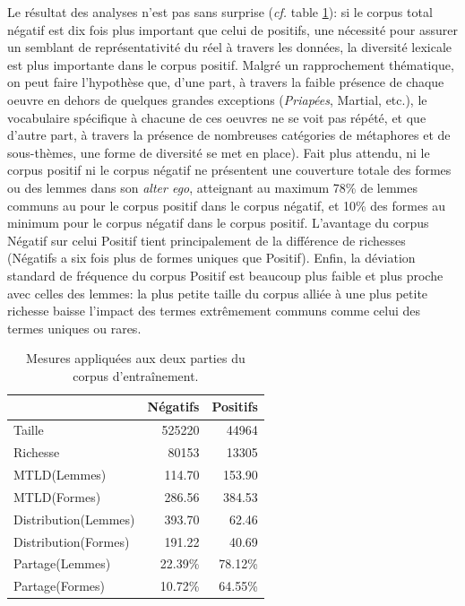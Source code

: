 Le résultat des analyses n'est pas sans surprise (\textit{cf.} table \ref{tab:chap4:mesures-corpora}): si le corpus total négatif est dix fois plus important que celui de positifs, une nécessité pour assurer un semblant de représentativité du réel à travers les données, la diversité lexicale est plus importante dans le corpus positif. Malgré un rapprochement thématique, on peut faire l'hypothèse que, d'une part, à travers la faible présence de chaque oeuvre en dehors de quelques grandes exceptions (\textit{Priapées}, Martial, etc.), le vocabulaire spécifique à chacune de ces oeuvres ne se voit pas répété, et que d'autre part, à travers la présence de nombreuses catégories de métaphores et de sous-thèmes, une forme de diversité se met en place). Fait plus attendu, ni le corpus positif ni le corpus négatif ne présentent une couverture totale des formes ou des lemmes dans son \textit{alter ego}, atteignant au maximum 78\% de lemmes communs au pour le corpus positif dans le corpus négatif, et 10\% des formes au minimum pour le corpus négatif dans le corpus positif. L'avantage du corpus Négatif sur celui Positif tient principalement de la différence de richesses (Négatifs a six fois plus de formes uniques que Positif). Enfin, la déviation standard de fréquence du corpus Positif est beaucoup plus faible et plus proche avec celles des lemmes: la plus petite taille du corpus alliée à une plus petite richesse baisse l'impact des termes extrêmement communs comme celui des termes uniques ou rares.

\begin{table}[ht]
    \centering
    \begin{tabular}{l|rr}
    \toprule
    {} &  Négatifs &  Positifs \\
    \midrule
    Taille               & 525220    &  44964    \\
    Richesse             &  80153    &  13305    \\
    MTLD(Lemmes)         &    114.70 &    153.90 \\
    MTLD(Formes)         &    286.56 &    384.53 \\
    Distribution(Lemmes) &    393.70 &     62.46 \\
    Distribution(Formes) &    191.22 &     40.69 \\
    Partage(Lemmes)      &   22.39\% &   78.12\% \\
    Partage(Formes)      &   10.72\% &   64.55\% \\
    \bottomrule
    \end{tabular}
    \caption{Mesures appliquées aux deux parties du corpus d'entraînement.}
    \label{tab:chap4:mesures-corpora}
\end{table}

